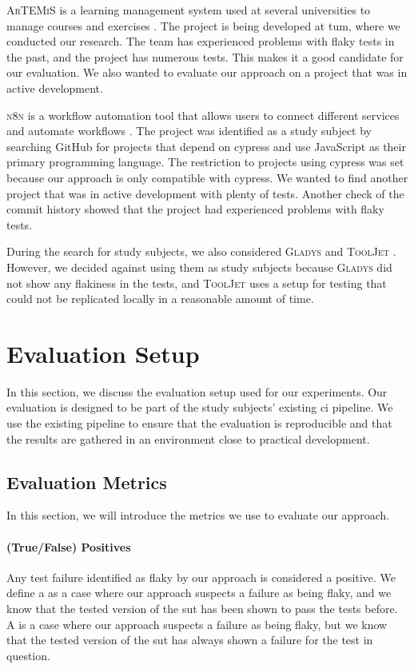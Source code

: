 \textsc{ArTEMiS} is a learning management system used at several universities to manage courses and exercises \autocite{krusche_artemis_2018}.
The project is being developed at \ac{tum}, where we conducted our research.
The team has experienced problems with flaky tests in the past, and the project has numerous tests.
This makes it a good candidate for our evaluation.
We also wanted to evaluate our approach on a project that was in active development.

\textsc{n8n} is a workflow automation tool that allows users to connect different services and automate workflows \autocite{noauthor_n8n_2023}.
The project was identified as a study subject by searching GitHub for projects that depend on cypress and use JavaScript as their primary programming language.
The restriction to projects using cypress was set because our approach is only compatible with cypress.
We wanted to find another project that was in active development with plenty of tests.
Another check of the commit history showed that the project had experienced problems with flaky tests.

During the search for study subjects, we also considered \textsc{Gladys} \autocite{noauthor_gladys_2023} and \textsc{ToolJet} \autocite{noauthor_tooljettooljet_2023}. However, we decided against using them as study subjects because \textsc{Gladys} did not show any flakiness in the tests, and \textsc{ToolJet} uses a setup for testing that could not be replicated locally in a reasonable amount of time.

\section{Evaluation Setup}
In this section, we discuss the evaluation setup used for our experiments.
Our evaluation is designed to be part of the study subjects' existing \ac{ci} pipeline.
We use the existing pipeline to ensure that the evaluation is reproducible and that the results are gathered in an environment close to practical development.

\subsection{Evaluation Metrics}
In this section, we will introduce the metrics we use to evaluate our approach.

\paragraph{(True/False) Positives} Any test failure identified as flaky by our approach is considered a positive.
We define a  as a case where our approach suspects a failure as being flaky, and we know that the tested version of the \ac{sut} has been shown to pass the tests before.
A  is a case where our approach suspects a failure as being flaky, but we know that the tested version of the \ac{sut} has always shown a failure for the test in question.

